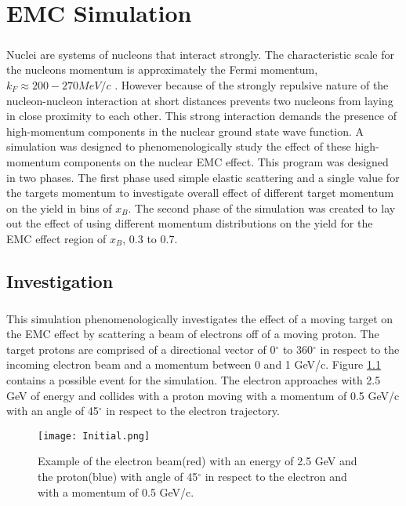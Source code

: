 \renewcommand{\textfraction}{0.45}
\chapter{EMC Simulation}\paragraph{}Nuclei are systems of nucleons that interact strongly. The characteristic scale for the nucleons momentum is approximately the Fermi momentum, $k_F \approx 200-270 MeV/c$ \cite{gomez}. However because of the strongly repulsive nature of the nucleon-nucleon interaction at short distances prevents two nucleons from laying in close proximity to each other. This strong interaction demands the presence of high-momentum components in the nuclear ground state wave function. A simulation was designed to phenomenologically study the effect of these high-momentum components on the nuclear EMC effect. This program was designed in two phases. The first phase used simple elastic scattering and a single value for the targets momentum to investigate overall effect of different target momentum on the yield in bins of $x_B$. The second phase of the simulation was created to lay out the effect of using different momentum distributions on the yield for the EMC effect region of $x_B$, 0.3 to 0.7.
\section{Investigation} \paragraph{}This simulation phenomenologically investigates the effect of a moving target on the EMC effect by scattering a beam of electrons off of a moving proton. The target protons are comprised of a directional vector of 0$^\circ$ to 360$^\circ$ in respect to the incoming electron beam and a momentum between 0 and 1 GeV/c. Figure \ref{example} contains a possible event for the simulation. The electron approaches with 2.5 GeV of energy and collides with a proton moving with a momentum of 0.5 GeV/c with an angle of 45$^\circ$ in respect to the electron trajectory. 
\begin{figure}[t]
\centering
\texttt{[image: Initial.png]}
\caption{Example of the electron beam(red) with an energy of 2.5 GeV and the proton(blue) with angle of 45$^\circ$ in respect to the electron and with a momentum of 0.5 GeV/c.}
\label{example}
\end{figure}
